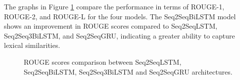 The graphs in Figure \ref{fig:rouge_comparison} compare the performance in terms of ROUGE-1, ROUGE-2, and ROUGE-L for the four models. The Seq2SeqBiLSTM model shows an improvement in ROUGE scores compared to Seq2SeqLSTM, Seq2Seq3BiLSTM, and Seq2SeqGRU, indicating a greater ability to capture lexical similarities.
\begin{figure}[H]
    \centering
    \hfill
    \hfill
    \hfill
    \hfill

    \hfill
    \hfill
    \hfill
    \hfill

    \hfill
    \hfill
    \hfill
    \hfill

    \caption{ROUGE scores comparison between Seq2SeqLSTM, Seq2SeqBiLSTM, Seq2Seq3BiLSTM and Seq2SeqGRU architectures.}
    \label{fig:rouge_comparison}
\end{figure}



